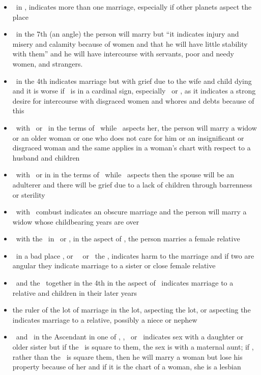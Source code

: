 \begin{itemize}
\item \Venus\, in \Libra, indicates more than one marriage, especially if other planets aspect the place
\item \Venus\, in the 7th (an angle) the person will marry but ``it indicates injury and misery and calamity because of women and that he will have little stability with them'' and he will have intercourse with servants, poor and needy women, and strangers.
\item \Venus\, in the 4th indicates marriage but with grief due to the wife and child dying and it is worse if \Venus\, is in a cardinal sign, especially \Cancer\, or \Capricorn, as it indicates a strong desire for intercourse with disgraced women and whores and debts because of this
\item \Saturn\, with \Venus\, or \Venus\, in the terms of \Saturn\, while \Saturn\, aspects her, the person will marry a widow or an older woman or one who does not care for him or an insignificant or disgraced woman and the same applies in a woman's chart with respect to a husband and children
\item \Venus\, with \Mars\, or in in the terms of \Mars\, while \Mars\, aspects then the spouse will be an adulterer and there will be grief due to a lack of children through barrenness or sterility

\item \Venus\, with \Jupiter\, combust indicates an obscure marriage and the person will marry a widow whose childbearing years are over
\item \Venus\, with the \Moon\, in \Cancer\, or \Taurus, in the aspect of \Jupiter, the person marries a female relative

\item \Venus\, in a bad place \Conjunction\Moon, or \Venus\, \Square\, or \Opposition\, the \Moon, indicates harm to the marriage and if two are angular they indicate marriage to a sister or close female relative

\item \Venus\, and the \Moon\, together in the 4th in the aspect of \Jupiter\, indicates marriage to a relative and children in their later years

\item the ruler of the lot of marriage in the lot, aspecting the lot, or aspecting the \Moon\, indicates marriage to a relative, possibly a niece or nephew

\item \Saturn\, and \Venus\, in the Ascendant in one of \Taurus, \Libra, \Capricorn\, or \Aquarius\, indicates sex with a daughter or older sister but if the \Moon\, is square to them, the sex is with a maternal aunt; if \Mars, rather than the \Moon\, is square them, then he will marry a woman but lose his property because of her and if it is the chart of a woman, she is a lesbian


\end{itemize}
